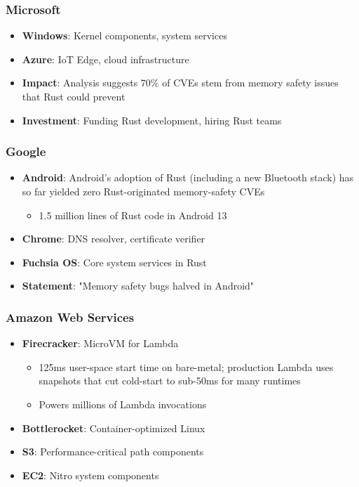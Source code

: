 \documentclass[11pt]{article}
\begin{document}
\subsubsection{Microsoft}
\begin{itemize}
    \item \textbf{Windows}: Kernel components, system services
    \item \textbf{Azure}: IoT Edge, cloud infrastructure
    \item \textbf{Impact}: Analysis suggests 70\% of CVEs stem from memory safety issues that Rust could prevent~\cite{msrc2019trends}
    \item \textbf{Investment}: Funding Rust development, hiring Rust teams
\end{itemize}

\subsubsection{Google}
\begin{itemize}
    \item \textbf{Android}: Android's adoption of Rust (including a new Bluetooth stack) has so far yielded zero Rust-originated memory-safety CVEs~\cite{google2022android}
    \begin{itemize}
        \item 1.5 million lines of Rust code in Android 13
    \end{itemize}
    \item \textbf{Chrome}: DNS resolver, certificate verifier
    \item \textbf{Fuchsia OS}: Core system services in Rust
    \item \textbf{Statement}: "Memory safety bugs halved in Android"~\cite{google2023memory}
\end{itemize}

\subsubsection{Amazon Web Services}
\begin{itemize}
    \item \textbf{Firecracker}: MicroVM for Lambda
    \begin{itemize}
        \item 125ms user-space start time on bare-metal; production Lambda uses snapshots that cut cold-start to sub-50ms for many runtimes~\cite{aws2019firecracker}
        \item Powers millions of Lambda invocations
    \end{itemize}
    \item \textbf{Bottlerocket}: Container-optimized Linux
    \item \textbf{S3}: Performance-critical path components
    \item \textbf{EC2}: Nitro system components
\end{itemize}
\end{document}

